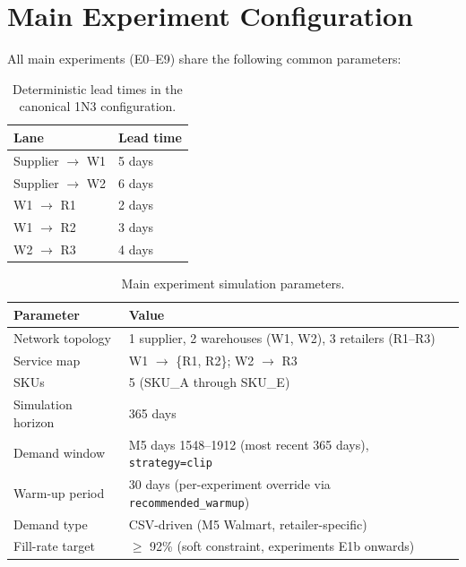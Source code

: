 \section{Main Experiment Configuration}
\label{sec:meth:config}

All main experiments (E0--E9) share the following common parameters:

\begin{table}[H]
  \centering
  \small
  \caption{Deterministic lead times in the canonical 1N3 configuration.}
  \label{tab:lead-times}
  \begin{tabular}{@{}ll@{}}
    \toprule
    Lane & Lead time \\
    \midrule
    Supplier $\to$ W1 & 5 days \\
    Supplier $\to$ W2 & 6 days \\
    W1 $\to$ R1       & 2 days \\
    W1 $\to$ R2       & 3 days \\
    W2 $\to$ R3       & 4 days \\
    \bottomrule
  \end{tabular}
\end{table}

\begin{table}[H]
  \centering
  \small
  \caption{Main experiment simulation parameters.}
  \label{tab:sim-params}
  \begin{tabular}{@{}p{4cm}p{8cm}@{}}
    \toprule
    Parameter & Value \\
    \midrule
    Network topology   & 1 supplier, 2 warehouses (W1, W2), 3 retailers (R1--R3) \\
    Service map        & W1 $\to$ \{R1, R2\};\; W2 $\to$ R3 \\
    SKUs               & 5 (SKU\_A through SKU\_E) \\
    Simulation horizon & 365 days \\
    Demand window      & M5 days 1548--1912 (most recent 365 days), \texttt{strategy=clip} \\
    Warm-up period     & 30 days (per-experiment override via \texttt{recommended\_warmup}) \\
    Demand type        & CSV-driven (M5 Walmart, retailer-specific) \\
    Fill-rate target   & $\geq$ 92\% (soft constraint, experiments E1b onwards) \\
    \bottomrule
  \end{tabular}
\end{table}

